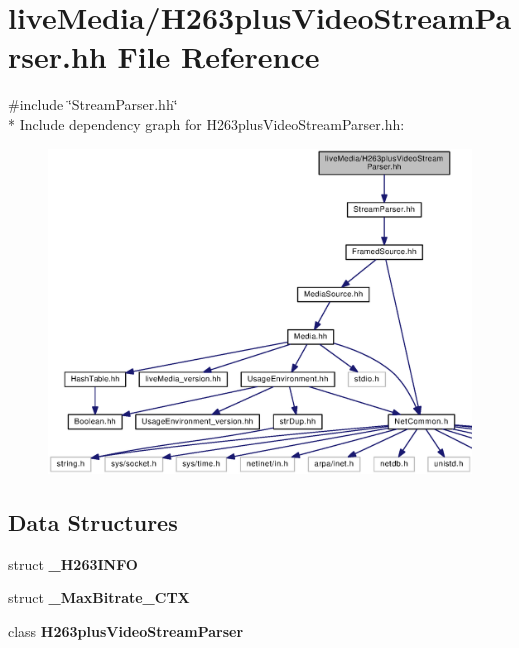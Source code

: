 \section{live\+Media/\+H263plus\+Video\+Stream\+Parser.hh File Reference}
\label{H263plusVideoStreamParser_8hh}
{\ttfamily \#include \char`\"{}Stream\+Parser.\+hh\char`\"{}}\\*
Include dependency graph for H263plus\+Video\+Stream\+Parser.\+hh\+:
\nopagebreak
\begin{figure}[H]
\begin{center}
\leavevmode
\includegraphics[width=350pt]{H263plusVideoStreamParser_8hh__incl}
\end{center}
\end{figure}
\subsection*{Data Structures}
\begin{DoxyCompactItemize}
\item 
struct {\bf \+\_\+\+H263\+I\+N\+F\+O}
\item 
struct {\bf \+\_\+\+Max\+Bitrate\+\_\+\+C\+T\+X}
\item 
class {\bf H263plus\+Video\+Stream\+Parser}
\end{DoxyCompactItemize}
